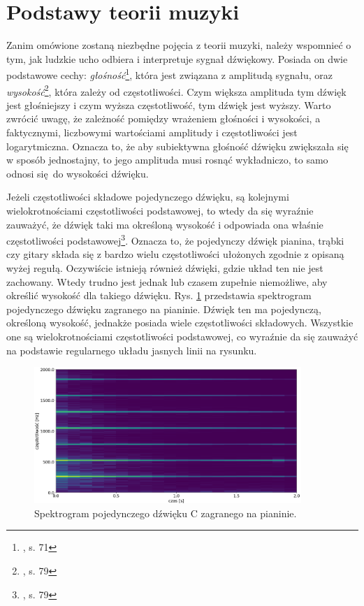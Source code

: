 \section{Podstawy teorii muzyki}

Zanim omówione zostaną niezbędne pojęcia z teorii muzyki, należy wspomnieć o tym, jak ludzkie ucho odbiera i interpretuje sygnał dźwiękowy. Posiada on dwie podstawowe cechy: \emph{głośność}\footnote{\cite{lerch_introduction_2012}, s. 71}, która jest związana z amplitudą sygnału, oraz \emph{wysokość}\footnote{\cite{lerch_introduction_2012}, s. 79}, która zależy od częstotliwości. Czym większa amplituda tym dźwięk jest głośniejszy i czym wyższa częstotliwość, tym dźwięk jest wyższy. Warto zwrócić uwagę, że zależność pomiędzy wrażeniem głośności i wysokości, a faktycznymi, liczbowymi wartościami amplitudy i częstotliwości jest logarytmiczna. Oznacza to, że aby subiektywna głośność dźwięku zwiększała się w sposób jednostajny, to jego amplituda musi rosnąć wykładniczo, to samo odnosi się do wysokości dźwięku. 

Jeżeli częstotliwości składowe pojedynczego dźwięku, są kolejnymi wielokrotnościami częstotliwości podstawowej, to wtedy da się wyraźnie zauważyć, że dźwięk taki ma określoną wysokość i odpowiada ona właśnie częstotliwości podstawowej\footnote{\cite{lerch_introduction_2012}, s. 79}. Oznacza to, że pojedynczy dźwięk pianina, trąbki czy gitary składa się z bardzo wielu częstotliwości ułożonych zgodnie z opisaną wyżej regułą. Oczywiście istnieją również dźwięki, gdzie układ ten nie jest zachowany. Wtedy trudno jest jednak lub czasem zupełnie niemożliwe, aby określić wysokość dla takiego dźwięku. Rys. \ref{fig:spektrogram_c} przedstawia spektrogram pojedynczego dźwięku zagranego na pianinie. Dźwięk ten ma pojedynczą, określoną wysokość, jednakże posiada wiele częstotliwości składowych. Wszystkie one są wielokrotnościami częstotliwości podstawowej, co wyraźnie da się zauważyć na podstawie regularnego układu jasnych linii na rysunku.

\begin{figure}[htb]
    \centering
    \includegraphics[width=0.9\textwidth]{images/spektrogram_c}
    \caption{Spektrogram pojedynczego dźwięku C zagranego na pianinie.}
    \label{fig:spektrogram_c}
\end{figure}


